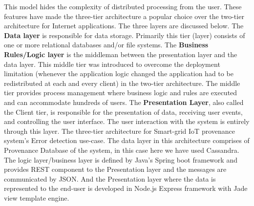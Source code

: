     This  model hides  the  complexity  of  distributed  processing  from  the  user.  These features   have   made   the   three-tier   architecture   a   popular choice over the two-tier architecture for Internet applications. The three layers are discussed below.
    \newline
    \newline
    The \textbf{Data layer} is  responsible  for  data  storage.  Primarily  this  tier  (layer)  consists of one or more relational databases and/or file systems.
    \newline
    \newline
    The \textbf{Business Rules/Logic layer} is the middleman between the presentation layer and  the  data  layer. This  middle  tier  was  introduced  to  overcome  the  deployment limitation (whenever
    the application logic changed the application had to be redistributed at  each  and  every  client)  in  the  two-tier  architecture.  The  middle  tier  provides  process
    management where business logic and rules are executed and can accommodate hundreds of  users.
    \newline
    \newline
    The \textbf{Presentation  Layer},  also  called  the Client  tier,  is responsible  for the presentation  of  data,  receiving  user  events,  and  controlling  the  user  interface.  The  user
    interaction with the system is entirely through this layer.
    \newline
    \newline
    The three-tier architecture for Smart-grid IoT provenance system's Error detection use-case. The data layer in this architecture comprises of Provenance Database of the system, in this case here we have used Cassandra. The logic layer/business layer is defined by Java's Spring boot framework and provides REST component to the Presentation layer and the messages are communicated by JSON. And the Presentation layer where the data is represented to the end-user is developed in Node.js Express framework with Jade view template engine.